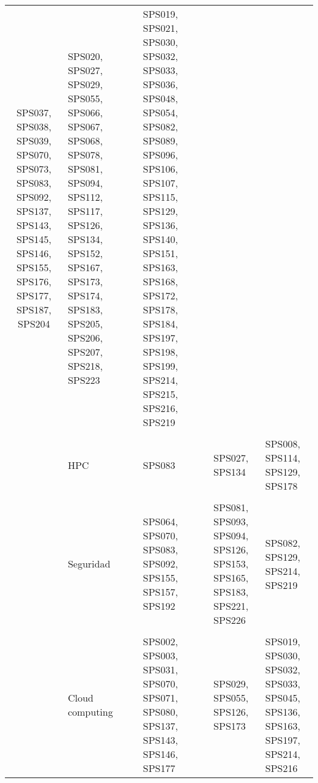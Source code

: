 \begin{longtable}{c Z Y Y Y}
SPS037, SPS038, SPS039, SPS070, SPS073, SPS083, SPS092, SPS137, SPS143, SPS145, SPS146, SPS155, SPS176, SPS177, SPS187, SPS204 & SPS020, SPS027, SPS029, SPS055, SPS066, SPS067, SPS068, SPS078, SPS081, SPS094, SPS112, SPS117, SPS126, SPS134, SPS152, SPS167, SPS173, SPS174, SPS183, SPS205, SPS206, SPS207, SPS218, SPS223 & SPS019, SPS021, SPS030, SPS032, SPS033, SPS036, SPS048, SPS054, SPS082, SPS089, SPS096, SPS106, SPS107, SPS115, SPS129, SPS136, SPS140, SPS151, SPS163, SPS168, SPS172, SPS178, SPS184, SPS197, SPS198, SPS199, SPS214, SPS215, SPS216, SPS219 \\\\ & HPC & SPS083 & SPS027, SPS134 & SPS008, SPS114, SPS129, SPS178 \\\\ & Seguridad & SPS064, SPS070, SPS083, SPS092, SPS155, SPS157, SPS192 & SPS081, SPS093, SPS094, SPS126, SPS153, SPS165, SPS183, SPS221, SPS226 & SPS082, SPS129, SPS214, SPS219 \\\\ & Cloud computing & SPS002, SPS003, SPS031, SPS070, SPS071, SPS080, SPS137, SPS143, SPS146, SPS177 & SPS029, SPS055, SPS126, SPS173 & SPS019, SPS030, SPS032, SPS033, SPS045, SPS136, SPS163, SPS197, SPS214, SPS216 \\ \bottomrule
\end{longtable}

\twocolumn